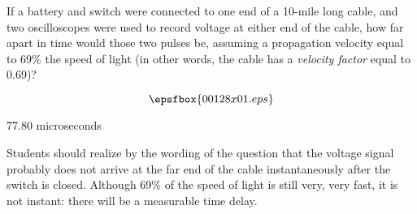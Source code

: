 

If a battery and switch were connected to one end of a 10-mile long cable, and two oscilloscopes were used to record voltage at either end of the cable, how far apart in time would those two pulses be, assuming a propagation velocity equal to 69\% the speed of light (in other words, the cable has a {\it velocity factor} equal to 0.69)?

$$\epsfbox{00128x01.eps}$$







77.80 microseconds







Students should realize by the wording of the question that the voltage signal probably does not arrive at the far end of the cable instantaneously after the switch is closed.  Although 69\% of the speed of light is still very, very fast, it is not instant: there will be a measurable time delay.




